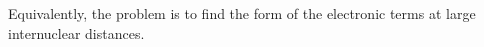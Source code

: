 Equivalently, the problem is to find the form of the electronic terms at large internuclear distances.
